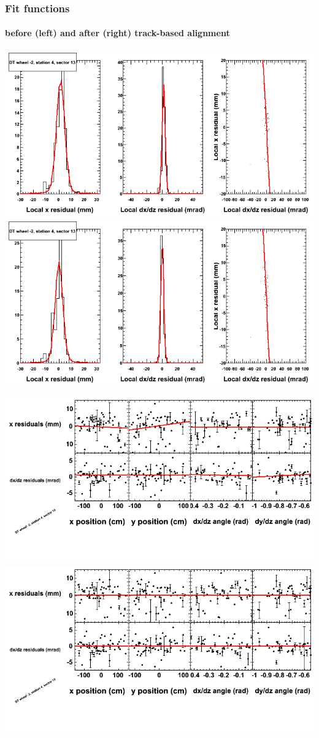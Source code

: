 \documentclass[compress]{beamer}
\begin{document}
\begin{frame}
\frametitle{Fit functions}
\framesubtitle{before (left) and after (right) track-based alignment}
\includegraphics[width=0.5\linewidth]{fitfunctions_re01/MBwhAst4sec13_bellcurves.png} \includegraphics[width=0.5\linewidth]{fitfunctions_re05/MBwhAst4sec13_bellcurves.png}

\includegraphics[width=0.5\linewidth]{fitfunctions_re01/MBwhAst4sec13_polynomials.png} \includegraphics[width=0.5\linewidth]{fitfunctions_re05/MBwhAst4sec13_polynomials.png}
\end{frame}
\end{document}
